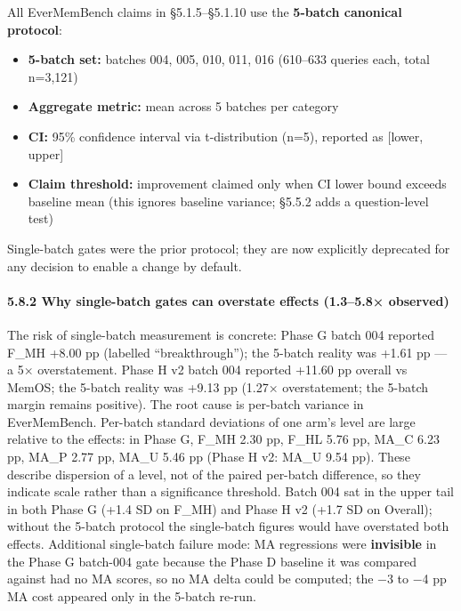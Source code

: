 \documentclass[
]{article}
\providecommand{\tightlist}{%
  \setlength{\itemsep}{0pt}\setlength{\parskip}{0pt}}
\begin{document}
All EverMemBench claims in §5.1.5--§5.1.10 use the \textbf{5-batch
canonical protocol}:

\begin{itemize}
\tightlist
\item
  \textbf{5-batch set:} batches 004, 005, 010, 011, 016 (610--633
  queries each, total n=3,121)
\item
  \textbf{Aggregate metric:} mean across 5 batches per category
\item
  \textbf{CI:} 95\% confidence interval via t-distribution (n=5),
  reported as {[}lower, upper{]}
\item
  \textbf{Claim threshold:} improvement claimed only when CI lower bound
  exceeds baseline mean (this ignores baseline variance; §5.5.2 adds a
  question-level test)
\end{itemize}

Single-batch gates were the prior protocol; they are now explicitly
deprecated for any decision to enable a change by default.

\paragraph{5.8.2 Why single-batch gates can overstate effects (1.3--5.8×
observed)}\label{why-single-batch-gates-can-overstate-effects-1.35.8-observed}

The risk of single-batch measurement is concrete: Phase G batch 004
reported F\_MH +8.00 pp (labelled ``breakthrough''); the 5-batch reality
was +1.61 pp --- a 5× overstatement. Phase H v2 batch 004 reported
+11.60 pp overall vs MemOS; the 5-batch reality was +9.13 pp (1.27×
overstatement; the 5-batch margin remains positive). The root cause is
per-batch variance in EverMemBench. Per-batch standard deviations of one
arm's level are large relative to the effects: in Phase G, F\_MH 2.30
pp, F\_HL 5.76 pp, MA\_C 6.23 pp, MA\_P 2.77 pp, MA\_U 5.46 pp (Phase H
v2: MA\_U 9.54 pp). These describe dispersion of a level, not of the
paired per-batch difference, so they indicate scale rather than a
significance threshold. Batch 004 sat in the upper tail in both Phase G
(+1.4 SD on F\_MH) and Phase H v2 (+1.7 SD on Overall); without the
5-batch protocol the single-batch figures would have overstated both
effects. Additional single-batch failure mode: MA regressions were
\textbf{invisible} in the Phase G batch-004 gate because the Phase D
baseline it was compared against had no MA scores, so no MA delta could
be computed; the −3 to −4 pp MA cost appeared only in the 5-batch
re-run.
\end{document}
